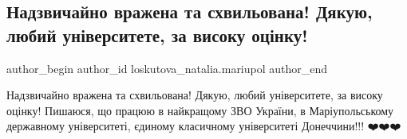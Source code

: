 
 
 
 
 

\subsection{Надзвичайно вражена та схвильована! Дякую, любий університете, за високу оцінку!}
\label{sec:07_12_2021.fb.loskutova_natalia.mariupol.1.nadzvichaino_vrazhen}

\ifcmt
 author_begin
   author_id loskutova_natalia.mariupol
 author_end
\fi

Надзвичайно вражена та схвильована! Дякую, любий університете, за високу
оцінку! Пишаюся, що працюю в найкращому ЗВО України, в Маріупольському
державному університеті, єдиному класичному університеті Донеччини!!! ❤️❤️❤️
